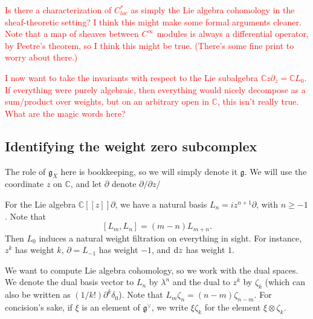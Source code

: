 \documentclass{amsart}
\def\CC{\mathbb C}
\def\d{{\rm d}}
\def\fg{\mathfrak g}
\def\ot{\otimes}
\def\owen{\textcolor{red}}
\begin{document}
\owen{Is there a characterization of $C^*_{loc}$ as simply the Lie algebra cohomology in the sheaf-theoretic setting? I think this might make some formal arguments cleaner. Note that a map of sheaves between $C^\infty$ modules is always a differential operator, by Peetre's theorem, so I think this might be true. (There's some fine print to worry about there.)}

\owen{I now want to take the invariants with respect to the Lie subalgebra $\CC z \partial_z = \CC L_0$. If everything were purely algebraic, then everything would nicely decompose as a sum/product over weights, but on an arbitrary open in $\CC$, this isn't really true. What are the magic words here?}

\subsection{Identifying the weight zero subcomplex}

The role of $\fg_X$ here is bookkeeping, so we will simply denote it $\fg$. We will use the coordinate $z$ on $\CC$, and let $\partial$ denote $\partial/\partial z$/

For the Lie algebra $\CC[[z]]\partial$, we have a natural basis $L_n = iz^{n+1} \partial$, with $n \geq -1$. Note that 
\[
[L_m,L_n] = (m-n) L_{m+n}.
\]
Then $L_0$ induces a natural weight filtration on everything in sight. For instance, $z^k$ has weight $k$, $\partial = L_{-1}$ has weight $-1$, and $\d z$ has weight $1$.

We want to compute Lie algebra cohomology, so we work with the dual spaces. We denote the dual basis vector to $L_n$ by $\lambda^n$ and the dual to $z^k$ by $\zeta_k$ (which can also be written as $(1/k!)\partial^k\delta_0$). Note that $L_m \zeta_n = (n-m) \zeta_{n-m}$. For concision's sake, if $\xi$ is an element of $\fg^\vee$, we write $\xi \zeta_k$ for the element $\xi \ot \zeta_k$. 
\end{document}
